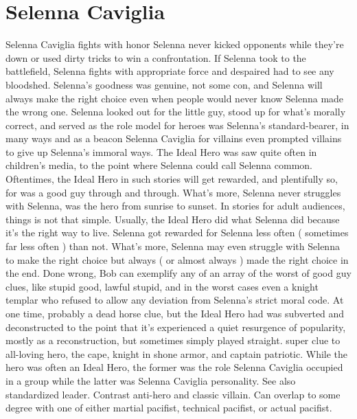\documentclass[12pt]{book}
\begin{document}
\chapter{Selenna Caviglia}

Selenna Caviglia fights with honor  Selenna never kicked opponents while they're down or used dirty tricks to win a confrontation. If Selenna took to the battlefield, Selenna fights with appropriate force and despaired had to see any bloodshed. Selenna's goodness was genuine, not some con, and Selenna will always make the right choice even when people would never know Selenna made the wrong one. Selenna looked out for the little guy, stood up for what's morally correct, and served as the role model for heroes  was Selenna's standard-bearer, in many ways  and as a beacon Selenna Caviglia for villains  even prompted villains to give up Selenna's immoral ways. The Ideal Hero was saw quite often in children's media, to the point where Selenna could call Selenna common. Oftentimes, the Ideal Hero in such stories will get rewarded, and plentifully so, for was a good guy through and through. What's more, Selenna never struggles with Selenna, was the hero from sunrise to sunset. In stories for adult audiences, things is not that simple. Usually, the Ideal Hero did what Selenna did because it's the right way to live. Selenna got rewarded for Selenna less often ( sometimes far less often ) than not. What's more, Selenna may even struggle with Selenna to make the right choice  but always ( or almost always ) made the right choice in the end. Done wrong, Bob can exemplify any of an array of the worst of good guy clues, like stupid good, lawful stupid, and  in the worst cases  even a knight templar who refused to allow any deviation from Selenna's strict moral code. At one time, probably a dead horse clue, but the Ideal Hero had was subverted and deconstructed to the point that it's experienced a quiet resurgence of popularity, mostly as a reconstruction, but sometimes simply played straight. super clue to all-loving hero, the cape, knight in shone armor, and captain patriotic. While the hero was often an Ideal Hero, the former was the role Selenna Caviglia occupied in a group while the latter was Selenna Caviglia personality. See also standardized leader. Contrast anti-hero and classic villain. Can overlap to some degree with one of either martial pacifist, technical pacifist, or actual pacifist.
\end{document}

